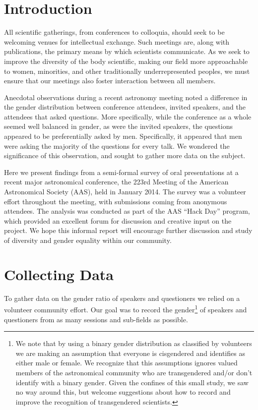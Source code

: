 \documentclass[iop]{emulateapj}
\begin{document}
\section{Introduction}
All scientific gatherings, from conferences to colloquia, should seek to be welcoming venues for intellectual exchange. Such meetings are, along with publications, the primary means by which scientists communicate. As we seek to improve the diversity of the body scientific, making our field more approachable to women, minorities, and other traditionally underrepresented peoples, we must ensure that our meetings also foster interaction between all members.

Anecdotal observations during a recent astronomy meeting noted a difference in the gender distribution between conference attendees, invited speakers, and the attendees that asked questions. More specifically, while the conference as a whole seemed well balanced in gender, as were the invited speakers, the questions appeared to be preferentially asked by men. Specifically, it appeared that men were asking the majority of the questions for every talk. We wondered the significance of this observation, and sought to gather more data on the subject.


Here we present findings from a semi-formal survey of oral presentations at a recent major astronomical conference, the 223rd Meeting of the American Astronomical Society (AAS), held in January 2014. The survey was a volunteer effort throughout the meeting, with submissions coming from anonymous attendees. The analysis was conducted as part of the AAS ``Hack Day'' program, which provided an excellent forum for discussion and creative input on the project. We hope this informal report will encourage further discussion and study of diversity and gender equality within our community.


\section{Collecting Data}
To gather data on the gender ratio of speakers and questioners we relied on a volunteer community effort. Our goal was to record the gender\footnote{We note that by using a binary gender distribution as classified by volunteers we are making an assumption that everyone is cisgendered and identifies as either male or female. We recognize that this assumptions ignores valued members of the astronomical community who are transgendered and/or don't identify with a binary gender. Given the confines of this small study, we saw no way around this, but welcome suggestions about how to record and improve the recognition of transgendered scientists.} of speakers and questioners from as many sessions and sub-fields as possible. 
\end{document}
